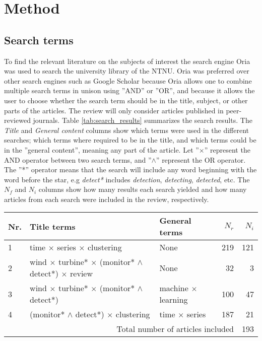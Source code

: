 \newpage
\chapter{Method}

\section{Search terms}
To find the relevant literature on the subjects of interest the search engine Oria was used to search the university library of the NTNU. Oria was preferred over other search engines such as Google Scholar because Oria allows one to combine multiple search terms in unison using ''AND'' or ''OR'', and because it allows the user to choose whether the search term should be in the title, subject, or other parts of the articles. The review will only consider articles published in peer-reviewed journals. Table \ref{tab:search_results} summarizes the search results. The \textit{Title} and \textit{General content} columns show which terms were used in the different searches; which terms where required to be in the title, and which terms could be in the ''general content'', meaning any part of the article. Let ''$\times$'' represent the AND operator between two search terms, and ''$\wedge$'' represent the OR operator. The ''*'' operator means that the search will include any word beginning with the word before the star, e.g \textit{detect*} includes \textit{detection}, \textit{detecting}, \textit{detected}, etc. The $N_f$ and $N_i$ columns show how many results each search yielded and how many articles from each search were included in the review, respectively. \bigskip 

\begin{table*}[h]
    \centering
    \begin{tabular}{ lllrr } 
        \toprule
        Nr. & Title terms & General terms & $N_r$ & $N_i$ \\
        \midrule
        1 & time $\times$ series $\times$ clustering & None & 219 & 121 \\ 
        2 & wind $\times$ turbine* $\times$ (monitor* $\wedge{}$ detect*) $\times$ review & None & 32 & 3 \\
        3 & wind $\times$ turbine* $\times$ (monitor* $\wedge{}$ detect*) & machine $\times$ learning & 100 & 47 \\ 
        4 & (monitor* $\wedge{}$ detect*) $\times$ clustering & time $\times$ series & 187 & 21 \\
        \midrule
        \multicolumn{4}{r}{Total number of articles included} & 193 \\
        \bottomrule
    \end{tabular}
    \caption{Search results}
    \label{tab:search_results}
\end{table*}

